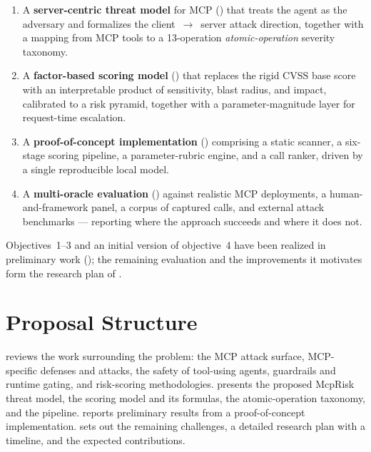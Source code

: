 \begin{enumerate}[leftmargin=*]
  \item A \textbf{server-centric threat model} for MCP
        () that treats the agent as the
        adversary and formalizes the client~$\to$~server attack direction,
        together with a mapping from MCP tools to a 13-operation
        \emph{atomic-operation} severity taxonomy.
  \item A \textbf{factor-based scoring model}
        () that replaces the rigid CVSS base score
        with an interpretable product of sensitivity, blast radius, and impact,
        calibrated to a risk pyramid, together with a parameter-magnitude layer
        for request-time escalation.
  \item A \textbf{proof-of-concept implementation} ()
        comprising a static scanner, a six-stage scoring pipeline, a
        parameter-rubric engine, and a call ranker, driven by a single
        reproducible local model.
  \item A \textbf{multi-oracle evaluation} () against
        realistic MCP deployments, a human-and-framework panel, a corpus of
        captured calls, and external attack benchmarks --- reporting where the
        approach succeeds and where it does not.
\end{enumerate}

Objectives~1--3 and an initial version of objective~4 have been realized in
preliminary work (); the remaining
evaluation and the improvements it motivates form the research plan of
.

\section{Proposal Structure}
\label{sec:intro:structure}

 reviews the work surrounding the problem: the MCP
attack surface, MCP-specific defenses and attacks, the safety of tool-using
agents, guardrails and runtime gating, and risk-scoring methodologies.
 presents the proposed McpRisk threat model, the scoring
model and its formulas, the atomic-operation taxonomy, and the pipeline.
 reports preliminary results from a proof-of-concept
implementation.  sets out the remaining
challenges, a detailed research plan with a timeline, and the expected
contributions.
